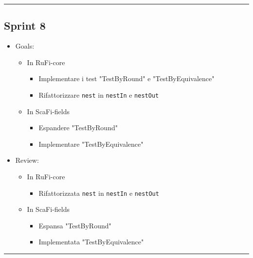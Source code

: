 \documentclass[12pt, a4paper]{article}
\begin{document}
\par\noindent\rule{\textwidth}{0.5pt}


\subsection*{Sprint 8}

\begin{itemize}
    \item Goals:
          \begin{itemize}
              \item In RuFi-core
                    \begin{itemize}
                        \item Implementare i test "TestByRound" e "TestByEquivalence"
                        \item Rifattorizzare \texttt{nest} in \texttt{nestIn} e \texttt{nestOut}
                    \end{itemize}
              \item In ScaFi-fields
                    \begin{itemize}
                        \item Espandere "TestByRound"
                        \item Implementare "TestByEquivalence"
                    \end{itemize}
          \end{itemize}
    \item Review:
          \begin{itemize}
              \item In RuFi-core
                    \begin{itemize}
                        \item Rifattorizzata \texttt{nest} in \texttt{nestIn} e \texttt{nestOut}
                    \end{itemize}
              \item In ScaFi-fields
                    \begin{itemize}
                        \item Espansa "TestByRound"
                        \item Implementata "TestByEquivalence"
                    \end{itemize}
          \end{itemize}
\end{itemize}

\par\noindent\rule{\textwidth}{0.5pt}
\end{document}
